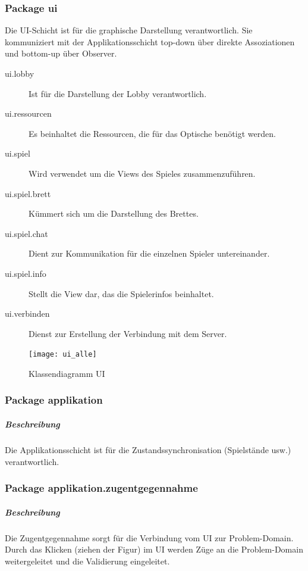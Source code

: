 \documentclass[12pt,halfparskip]{scrartcl}
\begin{document}

\clearpage
\subsubsection{Package ui} %
\label{ssub:package_ui}
Die UI-Schicht ist für die graphische Darstellung verantwortlich. Sie kommuniziert mit der Applikationsschicht top-down über direkte Assoziationen und bottom-up über Observer.

\begin{description}
	\item[ui.lobby] Ist für die Darstellung der Lobby verantwortlich.
	\item[ui.ressourcen] Es beinhaltet die Ressourcen, die für das Optische benötigt werden.
	\item[ui.spiel] Wird verwendet um die Views des Spieles zusammenzuführen.
	\item[ui.spiel.brett] Kümmert sich um die Darstellung des Brettes.
	\item[ui.spiel.chat] Dient zur Kommunikation für die einzelnen Spieler untereinander.
	\item[ui.spiel.info] Stellt die View dar, das die Spielerinfos beinhaltet.
	\item[ui.verbinden] Dienst zur Erstellung der Verbindung mit dem Server.
\end{description}

\begin{figure}[h]
	\centering
	\texttt{[image: ui\_alle]}
	\caption{Klassendiagramm UI}
	\label{fig:ui_alle}
\end{figure}

\clearpage
\subsubsection{Package applikation} %
\label{ssub:package_applikation}
\subparagraph{Beschreibung}
Die Applikationsschicht ist für die Zustandssynchronisation (Spielstände usw.) verantwortlich.

\subsubsection{Package applikation.zugentgegennahme} %
\label{ssub:package_applikation_zugentgegennahme}
\subparagraph{Beschreibung}
\label{ssub:beschreibung}
Die Zugentgegennahme sorgt für die Verbindung vom UI zur Problem-Domain. Durch das Klicken (ziehen der Figur) im UI werden Züge an die Problem-Domain weitergeleitet und die Validierung eingeleitet.
\end{document}
